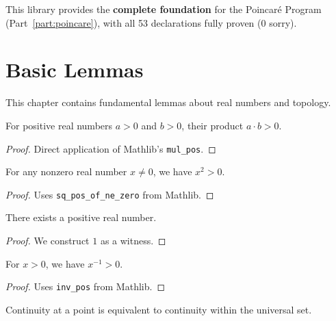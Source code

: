 This library provides the \textbf{complete foundation} for the Poincaré Program (Part~\ref{part:poincare}), with all 53 declarations fully proven (0 sorry).

\chapter{Basic Lemmas}
\label{chap:basic}

This chapter contains fundamental lemmas about real numbers and topology.

\begin{lemma}
\label{lem:pos_mul_pos}
\leanok
For positive real numbers $a > 0$ and $b > 0$, their product $a \cdot b > 0$.
\end{lemma}

\begin{proof}
\leanok
Direct application of Mathlib's \texttt{mul\_pos}.
\end{proof}

\begin{lemma}
\label{lem:square_pos_of_ne_zero}
\leanok
For any nonzero real number $x \neq 0$, we have $x^2 > 0$.
\end{lemma}

\begin{proof}
\leanok
Uses \texttt{sq\_pos\_of\_ne\_zero} from Mathlib.
\end{proof}

\begin{lemma}
\label{lem:exists_pos_real}
\leanok
There exists a positive real number.
\end{lemma}

\begin{proof}
\leanok
We construct $1$ as a witness.
\end{proof}

\begin{lemma}
\label{lem:inv_pos_of_pos}
\leanok
For $x > 0$, we have $x^{-1} > 0$.
\end{lemma}

\begin{proof}
\leanok
Uses \texttt{inv\_pos} from Mathlib.
\end{proof}

\begin{lemma}
\label{lem:continuousAt_iff}
\leanok
Continuity at a point is equivalent to continuity within the universal set.
\end{lemma}

